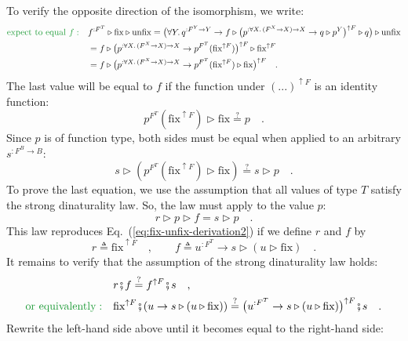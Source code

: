 To verify the opposite direction of the isomorphism, we write:
\begin{align*}
{\color{greenunder}\text{expect to equal }f:}\quad & f^{:F^{T}}\triangleright\text{fix}\triangleright\text{unfix}=\big(\forall Y.\,q^{:F^{Y}\rightarrow Y}\rightarrow f\triangleright\big(p^{:\forall X.\,(F^{X}\rightarrow X)\rightarrow X}\rightarrow q\triangleright p^{Y}\big)^{\uparrow F}\triangleright q\big)\triangleright\text{unfix}\\
 & =f\triangleright\big(p^{:\forall X.\,(F^{X}\rightarrow X)\rightarrow X}\rightarrow p^{F^{T}}(\text{fix}^{\uparrow F})\big)^{\uparrow F}\triangleright\text{fix}^{\uparrow F}\\
 & =f\triangleright\big(p^{:\forall X.\,(F^{X}\rightarrow X)\rightarrow X}\rightarrow p^{F^{T}}(\text{fix}^{\uparrow F})\triangleright\text{fix}\big)^{\uparrow F}\quad.
\end{align*}
The last value will be equal to $f$ if the function under $(...)^{\uparrow F}$
is an identity function:
\[
p^{F^{T}}(\text{fix}^{\uparrow F})\triangleright\text{fix}\overset{?}{=}p\quad.
\]
Since $p$ is of function type, both sides must be equal when applied
to an arbitrary $s^{:F^{B}\rightarrow B}$:
\begin{equation}
s\triangleright(p^{F^{T}}(\text{fix}^{\uparrow F})\triangleright\text{fix})\overset{?}{=}s\triangleright p\quad.\label{eq:fix-unfix-derivation2}
\end{equation}
To prove the last equation, we use the assumption that all values
of type $T$ satisfy the strong dinaturality law. So, the law must
apply to the value $p$:
\[
r\triangleright p\triangleright f=s\triangleright p\quad.
\]
This law reproduces Eq.~(\ref{eq:fix-unfix-derivation2}) if we define
$r$ and $f$ by
\[
r\triangleq\text{fix}^{\uparrow F}\quad,\quad\quad f\triangleq u^{:F^{T}}\rightarrow s\triangleright(u\triangleright\text{fix})\quad.
\]
It remains to verify that the assumption of the strong dinaturality
law holds:
\begin{align*}
 & r\bef f\overset{?}{=}f^{\uparrow F}\bef s\quad,\\
{\color{greenunder}\text{or equivalently}:}\quad & \text{fix}^{\uparrow F}\bef(u\rightarrow s\triangleright(u\triangleright\text{fix}))\overset{?}{=}\big(u^{:F^{T}}\rightarrow s\triangleright(u\triangleright\text{fix})\big)^{\uparrow F}\bef s\quad.
\end{align*}
Rewrite the left-hand side above until it becomes equal to the right-hand
side:
